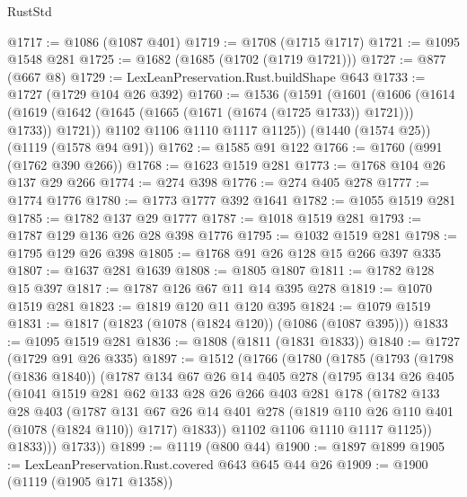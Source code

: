 \begin{lexlean}{RustStd}
\begin{coremodule}
{\begin{coremodule}
{{{{{{{@1717 := @1086 (@1087 @401)
@1719 := @1708 (@1715 @1717)
@1721 := @1095 @1548 @281
@1725 := @1682 (@1685 (@1702 (@1719 @1721)))
@1727 := @877 (@667 @8)
@1729 := LexLeanPreservation.Rust.buildShape @643
@1733 := @1727 (@1729 @104 @26 @392)
@1760 := @1536
    (@1591
      (@1601
        (@1606
          (@1614 (@1619 (@1642 (@1645 (@1665 (@1671 (@1674 (@1725 @1733)) @1721))) @1733)) @1721))
        @1102
        @1106
        @1110
        @1117
        @1125))
    (@1440 (@1574 @25))
    (@1119 (@1578 @94 @91))
@1762 := @1585 @91 @122
@1766 := @1760 (@991 (@1762 @390 @266))
@1768 := @1623 @1519 @281
@1773 := @1768 @104 @26 @137 @29 @266
@1774 := @274 @398
@1776 := @274 @405 @278
@1777 := @1774 @1776
@1780 := @1773 @1777 @392 @1641
@1782 := @1055 @1519 @281
@1785 := @1782 @137 @29 @1777
@1787 := @1018 @1519 @281
@1793 := @1787 @129 @136 @26 @28 @398 @1776
@1795 := @1032 @1519 @281
@1798 := @1795 @129 @26 @398
@1805 := @1768 @91 @26 @128 @15 @266 @397 @335
@1807 := @1637 @281 @1639
@1808 := @1805 @1807
@1811 := @1782 @128 @15 @397
@1817 := @1787 @126 @67 @11 @14 @395 @278
@1819 := @1070 @1519 @281
@1823 := @1819 @120 @11 @120 @395
@1824 := @1079 @1519
@1831 := @1817 (@1823 (@1078 (@1824 @120)) (@1086 (@1087 @395)))
@1833 := @1095 @1519 @281
@1836 := @1808 (@1811 (@1831 @1833))
@1840 := @1727 (@1729 @91 @26 @335)
@1897 := @1512
    (@1766
      (@1780
        (@1785
          (@1793
            (@1798 (@1836 @1840))
            (@1787
              @134
              @67
              @26
              @14
              @405
              @278
              (@1795
                @134
                @26
                @405
                (@1041
                  @1519
                  @281
                  @62
                  @133
                  @28
                  @26
                  @266
                  @403
                  @281
                  @178
                  (@1782
                    @133
                    @28
                    @403
                    (@1787
                      @131
                      @67
                      @26
                      @14
                      @401
                      @278
                      (@1819 @110 @26 @110 @401 (@1078 (@1824 @110)) @1717)
                      @1833))
                  @1102
                  @1106
                  @1110
                  @1117
                  @1125))
              @1833)))
        @1733))
@1899 := @1119 (@800 @44)
@1900 := @1897 @1899
@1905 := LexLeanPreservation.Rust.covered @643 @645 @44 @26
@1909 := @1900 (@1119 (@1905 @171 @1358))
}}}}}}}
\end{coremodule}}
\end{coremodule}
\end{lexlean}
